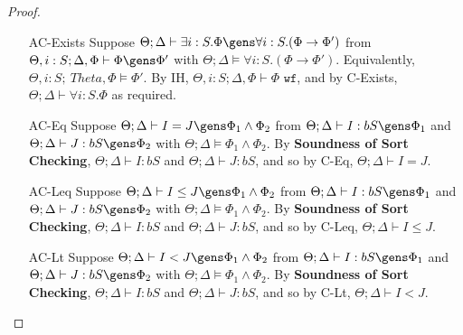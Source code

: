 \begin{proof}
\begin{itemize}
 \item[AC-Exists] Suppose $\Theta ; \Delta \vdash \exists i : S. \Phi \gens \forall i : S. (\Phi \to \Phi')$ from $\Theta, i : S ; \Delta, \Phi \vdash \Phi \gens \Phi'$ with $\Theta ; \Delta \vDash \forall i : S.(\Phi \to \Phi')$. Equivalently, $\Theta , i : S ; \ Theta, \Phi \vDash \Phi'$. By IH, $\Theta, i : S ; \Delta, \Phi \vdash \Phi \texttt{ wf}$, and by C-Exists, $\Theta ; \Delta \vdash \forall i : S. \Phi$ as required.
 \item[AC-Eq] Suppose $\Theta ; \Delta \vdash I = J \gens \Phi_1 \wedge \Phi_2$ from $\Theta ; \Delta \vdash I : bS \gens \Phi_1$ and  $\Theta ; \Delta \vdash J : bS \gens \Phi_2$ with $\Theta ; \Delta \vDash \Phi_1 \wedge \Phi_2$. By \textbf{Soundness of Sort Checking}, $\Theta ; \Delta \vdash I : bS$ and $\Theta ; \Delta \vdash J : bS$, and so by C-Eq, $\Theta ; \Delta \vdash I = J$.
 \item[AC-Leq] Suppose $\Theta ; \Delta \vdash I \leq J \gens \Phi_1 \wedge \Phi_2$ from $\Theta ; \Delta \vdash I : bS \gens \Phi_1$ and  $\Theta ; \Delta \vdash J : bS \gens \Phi_2$ with $\Theta ; \Delta \vDash \Phi_1 \wedge \Phi_2$. By \textbf{Soundness of Sort Checking}, $\Theta ; \Delta \vdash I : bS$ and $\Theta ; \Delta \vdash J : bS$, and so by C-Leq, $\Theta ; \Delta \vdash I \leq J$.
 \item[AC-Lt] Suppose $\Theta ; \Delta \vdash I < J \gens \Phi_1 \wedge \Phi_2$ from $\Theta ; \Delta \vdash I : bS \gens \Phi_1$ and  $\Theta ; \Delta \vdash J : bS \gens \Phi_2$ with $\Theta ; \Delta \vDash \Phi_1 \wedge \Phi_2$. By \textbf{Soundness of Sort Checking}, $\Theta ; \Delta \vdash I : bS$ and $\Theta ; \Delta \vdash J : bS$, and so by C-Lt, $\Theta ; \Delta \vdash I < J$.
\end{itemize}
\end{proof}